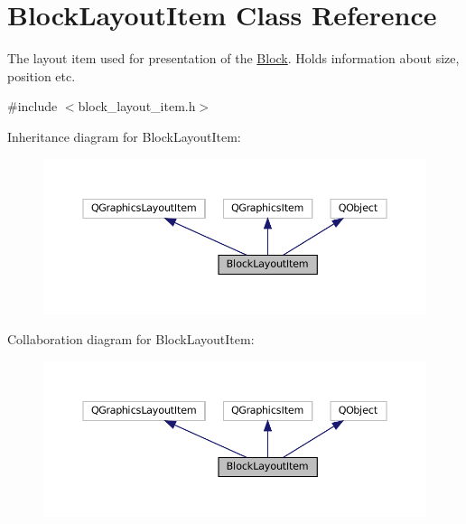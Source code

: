 \hypertarget{class_block_layout_item}{}\section{Block\+Layout\+Item Class Reference}
\label{class_block_layout_item}


The layout item used for presentation of the \mbox{\hyperlink{class_block}{Block}}. Holds information about size, position etc.  




{\ttfamily \#include $<$block\+\_\+layout\+\_\+item.\+h$>$}



Inheritance diagram for Block\+Layout\+Item\+:
\nopagebreak
\begin{figure}[H]
\begin{center}
\leavevmode
\includegraphics[width=350pt]{class_block_layout_item__inherit__graph}
\end{center}
\end{figure}


Collaboration diagram for Block\+Layout\+Item\+:
\nopagebreak
\begin{figure}[H]
\begin{center}
\leavevmode
\includegraphics[width=350pt]{class_block_layout_item__coll__graph}
\end{center}
\end{figure}
